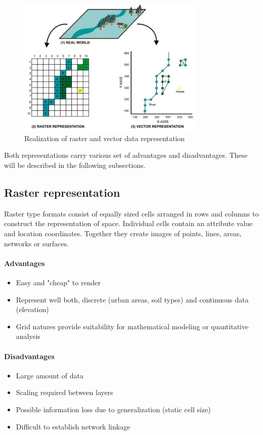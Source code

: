 \documentclass[thesis=M,english]{FITthesis}[2012/10/20]
\begin{document}
\begin{figure}[h]
\centering
\includegraphics[width=0.8\textwidth]{pics/RasterVectorPreview}
\caption{Realization of raster and vector data representation}
\label{pic:RasterVector}
\end{figure}

Both representations carry various set of advantages and disadvantages. These will be described in the following subsections.

\subsection{Raster representation}
Raster type formats consist of equally sized cells arranged in rows and columns to construct the representation of space. Individual cells contain an attribute value and location coordinates. Together they create images of points, lines, areas, networks or surfaces.

\paragraph*{Advantages}
\begin{itemize}[noitemsep]
\item Easy and "cheap" to render
\item Represent well both, discrete (urban areas, soil types) and continuous data (elevation)
\item Grid natures provide suitability for mathematical modeling or quantitative analysis
\end{itemize}

\paragraph*{Disadvantages}
\begin{itemize}[noitemsep]
\item Large amount of data
\item Scaling required between layers
\item Possible information loss due to generalization (static cell size)
\item Difficult to establish network linkage
\end{itemize}
\end{document}
